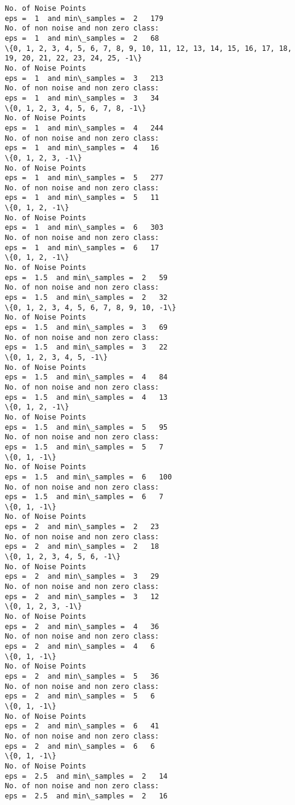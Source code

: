 \documentclass[11pt]{article}
\begin{document}
    \begin{Verbatim}[commandchars=\\\{\}]
No. of Noise Points
eps =  1  and min\_samples =  2   179
No. of non noise and non zero class:
eps =  1  and min\_samples =  2   68
\{0, 1, 2, 3, 4, 5, 6, 7, 8, 9, 10, 11, 12, 13, 14, 15, 16, 17, 18, 19, 20, 21, 22, 23, 24, 25, -1\}
No. of Noise Points
eps =  1  and min\_samples =  3   213
No. of non noise and non zero class:
eps =  1  and min\_samples =  3   34
\{0, 1, 2, 3, 4, 5, 6, 7, 8, -1\}
No. of Noise Points
eps =  1  and min\_samples =  4   244
No. of non noise and non zero class:
eps =  1  and min\_samples =  4   16
\{0, 1, 2, 3, -1\}
No. of Noise Points
eps =  1  and min\_samples =  5   277
No. of non noise and non zero class:
eps =  1  and min\_samples =  5   11
\{0, 1, 2, -1\}
No. of Noise Points
eps =  1  and min\_samples =  6   303
No. of non noise and non zero class:
eps =  1  and min\_samples =  6   17
\{0, 1, 2, -1\}
No. of Noise Points
eps =  1.5  and min\_samples =  2   59
No. of non noise and non zero class:
eps =  1.5  and min\_samples =  2   32
\{0, 1, 2, 3, 4, 5, 6, 7, 8, 9, 10, -1\}
No. of Noise Points
eps =  1.5  and min\_samples =  3   69
No. of non noise and non zero class:
eps =  1.5  and min\_samples =  3   22
\{0, 1, 2, 3, 4, 5, -1\}
No. of Noise Points
eps =  1.5  and min\_samples =  4   84
No. of non noise and non zero class:
eps =  1.5  and min\_samples =  4   13
\{0, 1, 2, -1\}
No. of Noise Points
eps =  1.5  and min\_samples =  5   95
No. of non noise and non zero class:
eps =  1.5  and min\_samples =  5   7
\{0, 1, -1\}
No. of Noise Points
eps =  1.5  and min\_samples =  6   100
No. of non noise and non zero class:
eps =  1.5  and min\_samples =  6   7
\{0, 1, -1\}
No. of Noise Points
eps =  2  and min\_samples =  2   23
No. of non noise and non zero class:
eps =  2  and min\_samples =  2   18
\{0, 1, 2, 3, 4, 5, 6, -1\}
No. of Noise Points
eps =  2  and min\_samples =  3   29
No. of non noise and non zero class:
eps =  2  and min\_samples =  3   12
\{0, 1, 2, 3, -1\}
No. of Noise Points
eps =  2  and min\_samples =  4   36
No. of non noise and non zero class:
eps =  2  and min\_samples =  4   6
\{0, 1, -1\}
No. of Noise Points
eps =  2  and min\_samples =  5   36
No. of non noise and non zero class:
eps =  2  and min\_samples =  5   6
\{0, 1, -1\}
No. of Noise Points
eps =  2  and min\_samples =  6   41
No. of non noise and non zero class:
eps =  2  and min\_samples =  6   6
\{0, 1, -1\}
No. of Noise Points
eps =  2.5  and min\_samples =  2   14
No. of non noise and non zero class:
eps =  2.5  and min\_samples =  2   16

\end{Verbatim}
\end{document}
